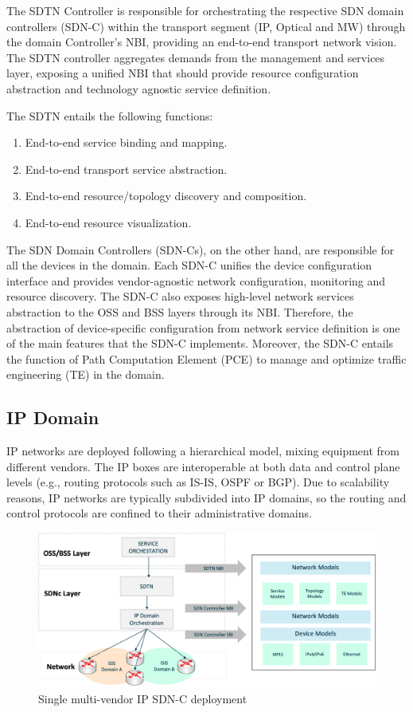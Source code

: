 \documentclass[a4paper,fleqn]{cas-dc}
\begin{document}
The SDTN Controller is responsible for orchestrating the respective SDN domain controllers (SDN-C) within the transport segment (IP, Optical and MW) through the domain Controller's NBI, providing an end-to-end transport network vision. 
The SDTN controller aggregates demands from the management and services layer, exposing a unified NBI that should provide resource configuration abstraction and technology agnostic service definition. 

The SDTN entails the following functions: 
\begin{enumerate}
    \item End-to-end service binding and mapping.
    \item End-to-end transport service abstraction.
    \item End-to-end resource/topology discovery and composition.
    \item End-to-end resource visualization.
\end{enumerate}

The SDN Domain Controllers (SDN-Cs), on the other hand, are responsible for all the devices in the domain. Each SDN-C unifies the device configuration interface and provides vendor-agnostic network configuration, monitoring and resource discovery. The SDN-C also exposes high-level network services abstraction to the OSS and BSS layers through its NBI. Therefore, the abstraction of device-specific configuration from network service definition is one of the main features that the SDN-C implements. Moreover, the SDN-C entails the function of Path Computation Element (PCE) to manage and optimize traffic engineering (TE) in the domain.

\subsection {IP Domain}
\label{section:ip}
IP networks are deployed following a hierarchical model, mixing equipment from different vendors. The IP boxes are interoperable at both data and control plane levels (e.g., routing protocols such as IS-IS, OSPF or BGP). Due to scalability reasons, IP networks are typically subdivided into IP domains, so the routing and control protocols are confined to their administrative domains.

\begin{figure}
	\centering
		\includegraphics[scale=0.5]{figs/ifusion_multidomain_2.png}
	\caption{Single multi-vendor IP SDN-C deployment}
	\label{FIG:2}
\end{figure}
\end{document}

